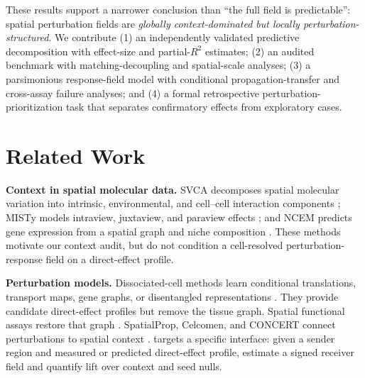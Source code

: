 These results support a narrower conclusion than ``the full field is
predictable'': spatial perturbation fields are \emph{globally
context-dominated but locally perturbation-structured}. We contribute
(1) an independently validated predictive decomposition with effect-size and
partial-$R^2$ estimates; (2) an audited \ppp benchmark with matching-decoupling
and spatial-scale analyses; (3) a parsimonious response-field model with
conditional propagation-transfer and cross-assay failure analyses; and
(4) a formal retrospective perturbation-prioritization task that separates
confirmatory effects from exploratory cases.

\section{Related Work}
\textbf{Context in spatial molecular data.}
SVCA decomposes spatial molecular variation into intrinsic, environmental, and
cell--cell interaction components \citep{arnol2019svca}; MISTy models
intraview, juxtaview, and paraview effects
\citep{tanevski2022misty}; and NCEM predicts gene expression from a spatial
graph and niche composition \citep{fischer2023ncem}. These methods motivate our
context audit, but do not condition a cell-resolved perturbation-response field
on a direct-effect profile.

\textbf{Perturbation models.}
Dissociated-cell methods learn conditional translations, transport maps, gene
graphs, or disentangled representations
\citep{lotfollahi2019scgen,Lotfollahi2023,bunne2023cellot,roohani2023gears,piran2024biolord}.
They provide candidate direct-effect profiles but remove the tissue graph.
Spatial functional assays restore that graph
\citep{dhainaut2022spatialcrispr,binan2025perturbfish,shen2026spatialperturbseq}.
SpatialProp, Celcomen, and CONCERT connect perturbations to spatial context
\citep{spatialprop2025,celcomen2026,concert2025}. \methodname{} targets a
specific interface: given a sender region and measured or predicted
direct-effect profile, estimate a signed receiver field and quantify lift over
context and seed nulls.

